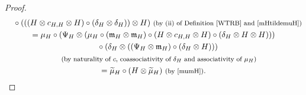 \documentclass[10pt,a4paper]{amsart}
\numberwithin{equation}{section}
\begin{document}
\begin{proof}
\begin{gather*}
\quad{}\circ(((H\otimes c_{H,H}\otimes H)\circ(\delta_{H}\otimes\delta_{H}))\otimes H)\ \text{\footnotesize\textnormal{(by (ii) of Definition \ref{WTRB} and \eqref{mHtildemuH})}}\\
= \mu_{H}\circ (\Psi_{H}\otimes (\mu_{H}\circ(\mathfrak{m}_{H}\otimes \mathfrak{m}_{H})\circ(H\otimes c_{H,H}\otimes H)\circ(\delta_{H}\otimes H\otimes H)))\\
\quad{}\circ(\delta_{H}\otimes ((\Psi_{H}\otimes \mathfrak{m}_{H})\circ(\delta_{H}\otimes H)))\\
\quad{}\ \text{\footnotesize\textnormal{(by naturality of $c$, coassociativity of $\delta_{H}$ and associativity of $\mu_{H}$)}}\\
= \widetilde{\mu}_{H}\circ(H\otimes\widetilde{\mu}_{H})\ \text{\footnotesize\textnormal{(by \eqref{mumH})}}.
\end{gather*}


\end{proof}
\end{document}
